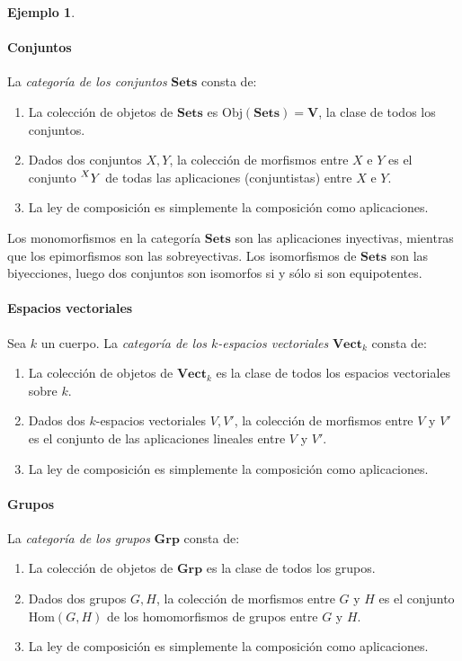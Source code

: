 \documentclass[12pt,a4paper]{book}
\theoremstyle{definition} \newtheorem{defn}[thm]{Definición}
\theoremstyle{definition} \newtheorem{ejemplo}[thm]{Ejemplo}
\theoremstyle{definition} \newtheorem{ejercicio}[thm]{Ejercicio}
\theoremstyle{remark} \newtheorem*{obs}{Observación}
\def\obj{\mathrm{Obj}}
\def\grp{\mathbf{Grp}}
\begin{document}
\begin{ejemplo}\leavevmode

  \paragraph{Conjuntos} La \emph{categoría de los conjuntos} $\mathbf{Sets}$ consta de:
  \begin{enumerate}
    \item La colección de objetos de $\mathbf{Sets}$ es $\obj(\mathbf{Sets})=\mathbf{V}$, la clase de todos los conjuntos.
    \item Dados dos conjuntos $X, Y$, la colección de morfismos entre $X$ e $Y$ es el conjunto $\prescript{X}{}Y$ de todas las aplicaciones (conjuntistas) entre $X$ e $Y$.
    \item La ley de composición es simplemente la composición como aplicaciones.
  \end{enumerate}
  Los monomorfismos en la categoría $\mathbf{Sets}$ son las aplicaciones inyectivas, mientras que los epimorfismos son las sobreyectivas. Los isomorfismos de $\mathbf{Sets}$ son las biyecciones, luego dos conjuntos son isomorfos si y sólo si son equipotentes.

  \paragraph{Espacios vectoriales} Sea $k$ un cuerpo. La \emph{categoría de los $k$-espacios vectoriales} $\mathbf{Vect}_k$ consta de:
  \begin{enumerate}
    \item La colección de objetos de $\mathbf{Vect}_k$ es la clase de todos los espacios vectoriales sobre $k$.
    \item Dados dos $k$-espacios vectoriales $V, V'$, la colección de morfismos entre $V$ y $V'$ es el conjunto de las aplicaciones lineales entre $V$ y $V'$.
    \item La ley de composición es simplemente la composición como aplicaciones.
  \end{enumerate}

  \paragraph{Grupos} La \emph{categoría de los grupos} $\grp$ consta de:
  \begin{enumerate}
    \item La colección de objetos de $\grp$ es la clase de todos los grupos.
    \item Dados dos grupos $G, H$, la colección de morfismos entre $G$ y $H$ es el conjunto $\mathrm{Hom}(G,H)$ de los homomorfismos de grupos entre $G$ y $H$.
    \item La ley de composición es simplemente la composición como aplicaciones.
  \end{enumerate}


\end{ejemplo}
\end{document}

